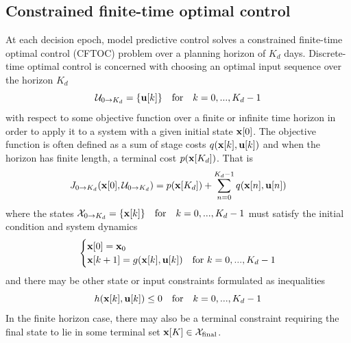 \documentclass[preprint,12pt]{elsarticle}
\begin{document}
\subsection{Constrained finite-time optimal control}\label{subsec:cftoc}

At each decision epoch, model predictive control solves a constrained finite-time optimal control (CFTOC) problem over a planning horizon of $K_{d}$ days. Discrete-time optimal control is concerned with choosing an optimal input sequence over the horizon $K_{d}$
\begin{equation}
\mathcal{U}_{0\to K_{d}} = \{ {\bf u}[k] \} \quad \text{for} \quad k=0,...,K_{d}-1
\label{eqn:U0K}
\end{equation}
with respect to some objective function over a finite or infinite time horizon in order to apply it to a system with a given initial state ${\bf x}[0]$. The objective function is often defined as a sum of stage costs $q({\bf x}[k], {\bf u}[k])$ and when the horizon has finite length, a terminal cost $p({\bf x}[K_{d}])$. That is
\begin{equation}
J_{0\to K_{d}}({\bf x}[0], \mathcal{U}_{0\to K_{d}}) = p({\bf x}[K_{d}]) + \sum_{n=0}^{K_{d}-1} q({\bf x}[n], {\bf u}[n])
\label{eqn:gen-opt-ctrl-cost}
\end{equation}
where the states $\mathcal{X}_{0\to K_{d}} = \{ {\bf x}[k] \} \quad \text{for} \quad k=0,...,K_{d}-1$ must satisfy the initial condition and system dynamics
\begin{equation}
\begin{cases}
{\bf x}[0] = {\bf x}_{0} \\
{\bf x}[k+1] = g({\bf x}[k], {\bf u}[k]) & \text{for } k=0,...,K_{d}-1
\end{cases}
\label{eqn:dyn-constraint}
\end{equation}
and there may be other state or input constraints formulated as inequalities
\begin{equation}
h({\bf x}[k], {\bf u}[k]) \leq 0 \quad \text{for} \quad k=0,...,K_{d}-1
\label{eqn:ineq-constraints}
\end{equation}
In the finite horizon case, there may also be a terminal constraint requiring the final state to lie in some terminal set ${\bf x}[K]\in\mathcal{X}_{\text{final}}$.
\end{document}
